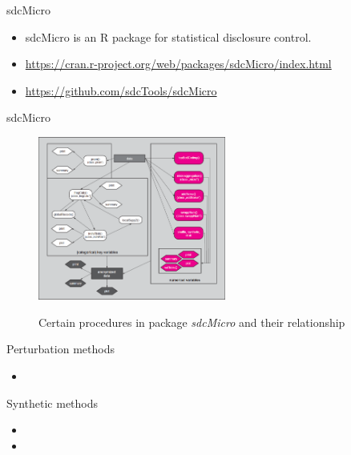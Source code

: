 \documentclass[
	11pt, %
]{beamer}
\begin{document}
\begin{frame}{sdcMicro}
\label{sdcmicro}
\begin{itemize}
\item
  sdcMicro is an R package for statistical disclosure control.
\item
  \url{https://cran.r-project.org/web/packages/sdcMicro/index.html}
\item
  \url{https://github.com/sdcTools/sdcMicro}
\end{itemize}
\end{frame}

\begin{frame}{sdcMicro}
\label{sdcmicro-1}

\begin{figure}[H]
{\centering \includegraphics[width=0.55\textwidth,height=\textheight]{gallery/sdcMicro.png}
}
\caption{Certain procedures in package \emph{sdcMicro} and their
relationship}
\end{figure}%

\end{frame}

\begin{frame}{Perturbation methods}
\label{perturbation-methods}
\begin{itemize}
\item
  \color{red}{sdcMicro}
\end{itemize}
\end{frame}

\begin{frame}{Synthetic methods}
\label{synthetic-methods}
\begin{itemize}
\item
  \color{red}{Introduction to synthetic data}
\item
  \Huge \color{red}{for Jiri/Oscar}
\end{itemize}
\end{frame}
\end{document}
